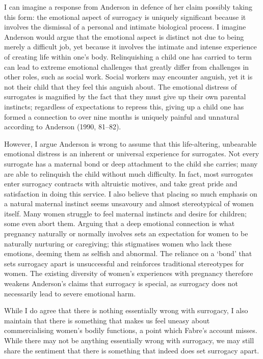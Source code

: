 I can imagine a response from Anderson in
defence of her claim possibly taking this form: the emotional aspect of
surrogacy is uniquely significant because it involves the dismissal of a
personal and intimate biological process. I imagine Anderson would argue
that the emotional aspect is distinct not due to being merely a
difficult job, yet because it involves the intimate and intense
experience of creating life within one's body. Relinquishing a child one has carried to term can lead to extreme emotional challenges that
greatly differ from challenges in other roles, such as social work.
Social workers may encounter anguish, yet it is not their child that
they feel this anguish about. The emotional distress of surrogates is
magnified by the fact that they must give up their own parental
instincts; regardless of expectations to repress this, giving up a child
one has formed a connection to over nine months is uniquely painful and
unnatural according to Anderson (1990, 81--82). 

However, I argue Anderson
is wrong to assume that this life-altering, unbearable emotional
distress is an inherent or universal experience for surrogates. Not
every surrogate has a maternal bond or deep attachment to the child she
carries; many are able to relinquish the child without much difficulty.
In fact, most surrogates enter surrogacy contracts with altruistic
motives, and take great pride and satisfaction in doing this service. I
also believe that placing so much emphasis on a natural maternal
instinct seems unsavoury and almost stereotypical of women itself. Many
women struggle to feel maternal instincts and desire for children; some
even abort them. Arguing that a deep emotional connection is what
pregnancy naturally or normally involves sets an expectation for women
to be naturally nurturing or caregiving; this stigmatises women who lack
these emotions, deeming them as selfish and abnormal. The reliance on a
`bond' that sets surrogacy apart is unsuccessful and reinforces
traditional stereotypes for women. The existing diversity of women's
experiences with pregnancy therefore weakens Anderson's claims that
surrogacy is special, as surrogacy does not necessarily lead to severe
emotional harm. 

While I do agree that there is nothing essentially wrong
with surrogacy, I also maintain that there is something that makes us
feel uneasy about commercialising women's bodily functions, a point
which Fabre's account misses. While there may not be anything
essentially wrong with surrogacy, we may still share the sentiment that
there is something that indeed does set surrogacy apart. 

